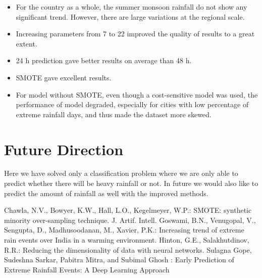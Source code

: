 \documentclass[11pt,a4paper]{article}
\begin{document}
\begin{itemize}
\item For the country as a whole, the summer monsoon rainfall do not show any significant trend. However, there are large variations at the regional scale.
\item Increasing parameters from 7 to 22 improved the quality of results to a great extent.
\item 24 h prediction gave better results on average than 48 h.
\item SMOTE gave excellent results.
\item For model without SMOTE, even though a cost-sensitive model was used, the performance of model degraded, especially for cities with low percentage of extreme rainfall days, and thus made the dataset more skewed.
\end{itemize}

 \section{Future Direction}
 Here we have solved only a classification problem where we are only able to predict whether there will be heavy rainfall or not. In future we would also like to predict the amount of rainfall as well with the improved methods.

\begin{thebibliography}{9}
 Chawla, N.V., Bowyer, K.W., Hall, L.O., Kegelmeyer, W.P.: SMOTE: synthetic minority over-sampling technique. J. Artif. Intell.
\bibitem{} Goswami, B.N., Venugopal, V., Sengupta, D., Madhusoodanan, M., Xavier, P.K.: Increasing trend of extreme rain events over India in a warming environment.
 Hinton, G.E., Salakhutdinov, R.R.: Reducing the dimensionality of data with neural networks.
\bibitem{} Sulagna Gope, Sudeshna Sarkar, Pabitra Mitra, and Subimal Ghosh : Early Prediction of Extreme Rainfall Events: A Deep Learning Approach
\end{thebibliography}
\end{document}
